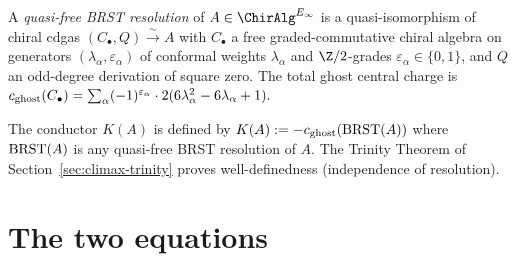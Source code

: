 \begin{definition}
\label{def:brst-resolution-climax}
A \emph{quasi-free BRST resolution} of \(A \in \ChirAlgInf\) is a
quasi-isomorphism of chiral cdgas
\(
  (C_{\bullet}, Q) \xrightarrow{\sim} A
\)
with \(C_{\bullet}\) a free graded-commutative chiral algebra on
generators \((\lambda_{\alpha}, \varepsilon_{\alpha})\) of conformal
weights \(\lambda_{\alpha}\) and \(\Z/2\)-grades
\(\varepsilon_{\alpha} \in \{0,1\}\), and \(Q\) an odd-degree derivation
of square zero. The total ghost central charge is
\(
  c_{\mathrm{ghost}}(C_{\bullet})
    = \sum_{\alpha} (-1)^{\varepsilon_{\alpha}} \cdot 2(6\lambda_{\alpha}^{2} - 6\lambda_{\alpha} + 1).
\)
\end{definition}

The conductor \(K(A)\) is defined by \(K(A) := -c_{\mathrm{ghost}}(\mathrm{BRST}(A))\)
where \(\mathrm{BRST}(A)\) is any quasi-free BRST resolution of \(A\). The
Trinity Theorem of Section~\ref{sec:climax-trinity} proves
well-definedness (independence of resolution).

\section{The two equations}
\label{sec:climax-two-equations}


